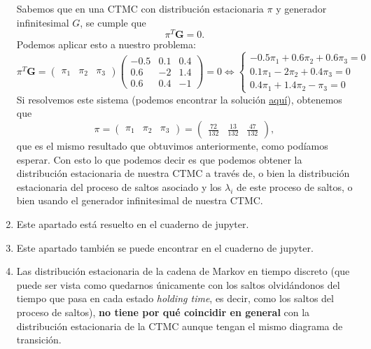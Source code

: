 \documentclass[a4paper]{article}
\begin{document}
\begin{enumerate}[label=(\alph*)]
        Sabemos que en una CTMC con distribución estacionaria $\pi$ y generador infinitesimal $G$,  se cumple que
        \[
        \pi^{T} \mathbf{G} = 0.
        \]
        Podemos aplicar esto a nuestro problema:
        \[
        \pi^{T} \mathbf G = \begin{pmatrix} \pi_{1} & \pi_{2} & \pi_{3} \end{pmatrix}    \begin{pmatrix}
          -0.5 & 0.1 & 0.4 \\
          0.6 & -2 & 1.4 \\
          0.6 & 0.4 & -1
        \end{pmatrix} = 0
        \Longleftrightarrow
        \begin{cases}
          -0.5 \pi_{1} + 0.6 \pi_{2} + 0.6\pi_{3} = 0 \\
          0.1 \pi_{1} - 2\pi_{2}+ 0.4 \pi_{3} = 0\\
          0.4 \pi_{1} + 1.4 \pi_{2} - \pi_{3} = 0
          \end{cases}
        \]
        Si resolvemos este sistema (podemos encontrar la solución \href{https://www.wolframalpha.com/input/?i=systems+of+equations+calculator&assumption=%7B%22F%22%2C+%22SolveSystemOf4EquationsCalculator%22%2C+%22equation1%22%7D+-%3E%22+-0.5*x+%2B++0.6*y+%2B0.6*z+%3D+0%22&assumption=%22FSelect%22+-%3E+%7B%7B%22SolveSystemOf4EquationsCalculator%22%7D%7D&assumption=%7B%22F%22%2C+%22SolveSystemOf4EquationsCalculator%22%2C+%22equation2%22%7D+-%3E%220.1*x+-+2*y+%2B+0.4*z+%3D+0%22&assumption=%7B%22F%22%2C+%22SolveSystemOf4EquationsCalculator%22%2C+%22equation3%22%7D+-%3E%220.4*x+%2B+1.4*y+-+z+%3D+0%22&assumption=%7B%22F%22%2C+%22SolveSystemOf4EquationsCalculator%22%2C+%22equation4%22%7D+-%3E%22x+%2B+y+%2B+z+%3D+1%22}{aquí}), obtenemos que
        \[
        \pi = \begin{pmatrix} \pi_{1} & \pi_{2} & \pi_{3} \end{pmatrix} = \begin{pmatrix} \frac{72}{132} & \frac{13}{132} & \frac{47}{132} \end{pmatrix},
        \]
        que es el mismo resultado que obtuvimos anteriormente, como podíamos esperar. Con esto lo que podemos decir es que podemos obtener la distribución estacionaria de nuestra CTMC a través de, o bien la distribución estacionaria del proceso de saltos asociado y los $\lambda_{i}$ de este proceso de saltos, o bien usando el generador infinitesimal de nuestra CTMC.

  \item Este apartado está resuelto en el cuaderno de jupyter.
  \item Este apartado también se puede encontrar en el cuaderno de jupyter.
  \item Las distribución estacionaria de la cadena de Markov en tiempo discreto (que puede ser vista como quedarnos únicamente con los saltos olvidándonos del tiempo que pasa en cada estado \emph{holding time}, es decir, como los saltos del proceso de saltos), \textbf{no tiene por qué coincidir en general} con la distribución estacionaria de la CTMC aunque tengan el mismo diagrama de transición.


\end{enumerate}
\end{document}
